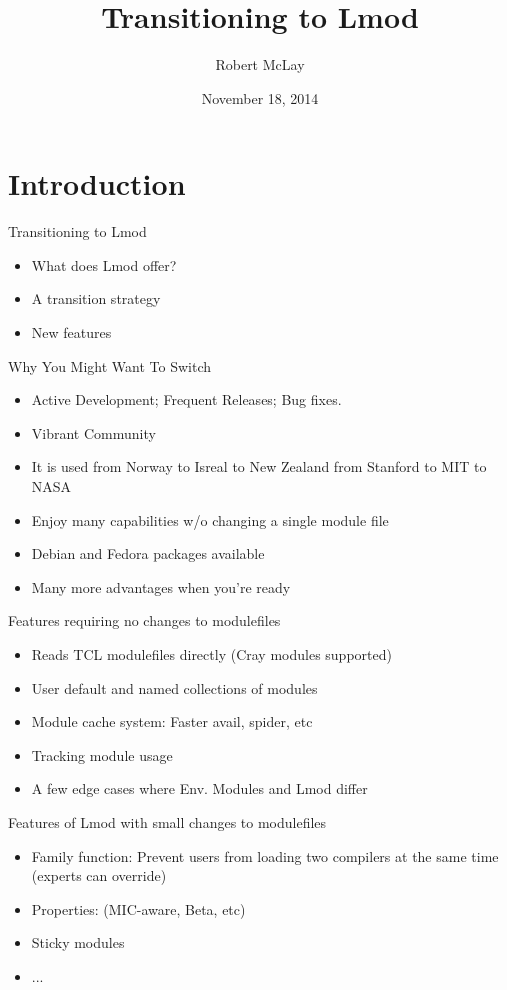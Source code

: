 \documentclass{beamer}
\title{Transitioning to Lmod}
\author{Robert McLay}
\institute{The Texas Advanced Computing Center}
\date{November 18, 2014}  %
\begin{document}
\begin{frame}
  \titlepage
\end{frame}

\section{Introduction}

\begin{frame}{Transitioning to Lmod}
  \begin{itemize}
    \item What does Lmod offer?
    \item A transition strategy
    \item New features
  \end{itemize}
\end{frame}


\begin{frame}{Why You Might Want To Switch}
  \begin{itemize}
    \item Active Development;  Frequent Releases; Bug fixes.
    \item Vibrant Community
    \item It is used from Norway to Isreal to New Zealand from Stanford to MIT to NASA
    \item Enjoy many capabilities w/o changing a single module file
    \item Debian and Fedora packages available
    \item Many more advantages when you're ready
  \end{itemize}
\end{frame}

\begin{frame}{Features requiring no changes to modulefiles}
  \begin{itemize}
    \item Reads TCL modulefiles directly (Cray modules supported)
    \item User default and named collections of modules
    \item Module cache system: Faster avail, spider, etc
    \item Tracking module usage 
    \item A few edge cases where Env. Modules and Lmod differ
  \end{itemize}
\end{frame}

\begin{frame}{Features of Lmod with small changes to modulefiles}
  \begin{itemize}
    \item Family function: Prevent users from loading two compilers at
      the same time (experts can override)
    \item Properties: (MIC-aware, Beta, etc)
    \item Sticky modules
    \item ...
  \end{itemize}
\end{frame}
\end{document}
